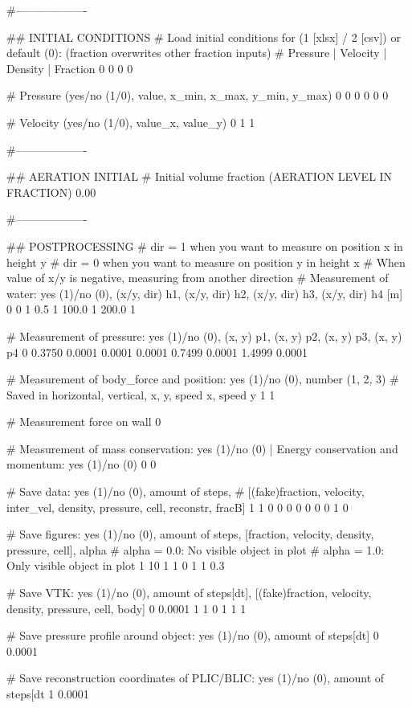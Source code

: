 #-------------------

## INITIAL CONDITIONS
# Load initial conditions for (1 [xlsx] / 2 [csv]) or default (0): (fraction overwrites other fraction inputs)
# Pressure 		| Velocity		| Density		| Fraction
0   0   0   0

# Pressure (yes/no (1/0), value, x_min, x_max, y_min, y_max)
0 0 0 0 0 0

# Velocity (yes/no (1/0), value_x, value_y)
0 1 1

#-------------------

## AERATION INITIAL
# Initial volume fraction (AERATION LEVEL IN FRACTION)
0.00

#-------------------

## POSTPROCESSING
# dir = 1 when you want to measure on position x in height y
# dir = 0 when you want to measure on position y in height x
# When value of x/y is negative, measuring from another direction
# Measurement of water: yes (1)/no (0), (x/y, dir) h1, (x/y, dir) h2, (x/y, dir) h3, (x/y, dir) h4 [m]
0   0 1  0.5 1  100.0 1  200.0 1

# Measurement of pressure: yes (1)/no (0), (x, y) p1, (x, y) p2, (x, y) p3, (x, y) p4
0	0.3750 0.0001	0.0001 0.0001	0.7499 0.0001     1.4999 0.0001

# Measurement of body_force and position: yes (1)/no (0), number (1, 2, 3)
# Saved in horizontal, vertical, x, y, speed x, speed y
1 1

# Measurement force on wall
0

# Measurement of mass conservation: yes (1)/no (0) | Energy conservation and momentum: yes (1)/no (0)
0 0

# Save data: yes (1)/no (0), amount of steps,
# [(fake)fraction, velocity, inter_vel, density, pressure, cell, reconstr, fracB]
1	1	0 0 0 0 0 0 0 1 0

# Save figures: yes (1)/no (0), amount of steps, [fraction, velocity, density, pressure, cell], alpha
# alpha = 0.0: No visible object in plot
# alpha = 1.0: Only visible object in plot
1 	10	1 1 0 1 1	0.3

# Save VTK: yes (1)/no (0), amount of steps[dt], [(fake)fraction, velocity, density, pressure, cell, body]
0	0.0001	1 1 0 1 1 1

# Save pressure profile around object: yes (1)/no (0), amount of steps[dt]
0  0.0001

# Save reconstruction coordinates of PLIC/BLIC: yes (1)/no (0), amount of steps[dt
1 0.0001
